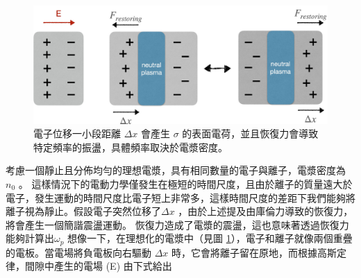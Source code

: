 \begin{figure}
  \centering
  \includegraphics[scale = 0.1]{figures/plasma oscillator.jpeg}
  \caption{電子位移一小段距離 \(\Delta x\) 會產生 \(\sigma\) 的表面電荷，並且恢復力會導致特定頻率的振盪，具體頻率取決於電漿密度。}
  \label{fig:plasma_oscillator}
\end{figure}

考慮一個靜止且分佈均勻的理想電漿，具有相同數量的電子與離子，電漿密度為\(n_{0}\) 。
這樣情況下的電動力學僅發生在極短的時間尺度，且由於離子的質量遠大於電子，發生運動的時間尺度比電子短上非常多，這樣時間尺度的差距下我們能夠將離子視為靜止。假設電子突然位移了\(\Delta x\) ，由於上述提及由庫倫力導致的恢復力，將會產生一個簡諧震盪運動。
恢復力造成了電漿的震盪，這也意味著透過恢復力能夠計算出\(\omega_{p}\)
想像一下，在理想化的電漿中（見圖 \ref{fig:plasma_oscillator}），電子和離子就像兩個重疊的電板。當電場將負電板向右驅動 \(\Delta x\) 時，它會將離子留在原地，而根據高斯定律，間隙中產生的電場 (E) 由下式給出

